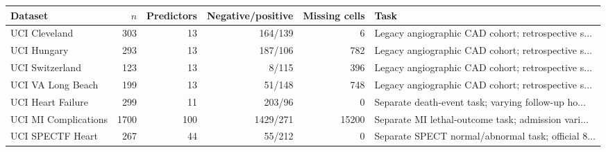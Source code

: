 \begin{tabular}{lrrrrl}
\toprule
Dataset & $n$ & Predictors & Negative/positive & Missing cells & Task \\
\midrule
UCI Cleveland & 303 & 13 & 164/139 & 6 & Legacy angiographic CAD cohort; retrospective s... \\
UCI Hungary & 293 & 13 & 187/106 & 782 & Legacy angiographic CAD cohort; retrospective s... \\
UCI Switzerland & 123 & 13 & 8/115 & 396 & Legacy angiographic CAD cohort; retrospective s... \\
UCI VA Long Beach & 199 & 13 & 51/148 & 748 & Legacy angiographic CAD cohort; retrospective s... \\
UCI Heart Failure & 299 & 11 & 203/96 & 0 & Separate death-event task; varying follow-up ho... \\
UCI MI Complications & 1700 & 100 & 1429/271 & 15200 & Separate MI lethal-outcome task; admission vari... \\
UCI SPECTF Heart & 267 & 44 & 55/212 & 0 & Separate SPECT normal/abnormal task; official 8... \\
\bottomrule
\end{tabular}
